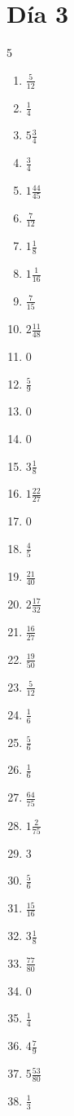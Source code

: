 \documentclass[12pt]{article}
\begin{document}
\section*{Día 3}
\begin{multicols}{5}\begin{enumerate}
\item $ \frac{5}{12} $
\item $ \frac{1}{4} $
\item $ 5 \frac{3}{4} $
\item $ \frac{3}{4} $
\item $ 1 \frac{44}{45} $
\item $ \frac{7}{12} $
\item $ 1 \frac{1}{8} $
\item $ 1 \frac{1}{16} $
\item $ \frac{7}{15} $
\item $ 2 \frac{11}{48} $
\item $ 0 $
\item $ \frac{5}{9} $
\item $ 0 $
\item $ 0 $
\item $ 3 \frac{1}{8} $
\item $ 1 \frac{22}{27} $
\item $ 0 $
\item $ \frac{4}{5} $
\item $ \frac{21}{40} $
\item $ 2 \frac{17}{32} $
\item $ \frac{16}{27} $
\item $ \frac{19}{50} $
\item $ \frac{5}{12} $
\item $ \frac{1}{6} $
\item $ \frac{5}{6} $
\item $ \frac{1}{6} $
\item $ \frac{64}{75} $
\item $ 1 \frac{2}{75} $
\item $ 3 $
\item $ \frac{5}{6} $
\item $ \frac{15}{16} $
\item $ 3 \frac{1}{8} $
\item $ \frac{77}{80} $
\item $ 0 $
\item $ \frac{1}{4} $
\item $ 4 \frac{7}{9} $
\item $ 5 \frac{53}{80} $
\item $ \frac{1}{3} $

\end{enumerate}
\end{multicols}
\end{document}
